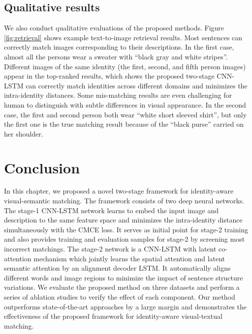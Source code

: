 \subsection{Qualitative results}
We also conduct qualitative evaluations of the proposed methods. Figure \ref{fig:retrieval} shows example text-to-image retrieval results. Most sentences can correctly match images corresponding to their descriptions. In the first case, almost all the persons wear a sweater with ``black gray and white stripes''. Different images of the same identity (the first, second, and fifth person images) appear in the top-ranked results, which shows the proposed two-stage CNN-LSTM can correctly match identities across different domains and minimizes the intra-identity distances. Some mis-matching results are even challenging for human to distinguish with subtle differences in visual appearance. In the second case, the first and second person both wear ``white short sleeved shirt'', but only the first one is the true matching result because of the ``black purse'' carried on her shoulder.

\section{Conclusion}
In this chapter, we proposed a novel two-stage framework for identity-aware visual-semantic matching. The framework consists of two deep neural networks. The stage-1 CNN-LSTM network learns to embed the input image and description to the same feature space and minimizes the intra-identity distance simultaneously with the CMCE loss. It serves as initial point for stage-2 training and also provides training and evaluation samples for stage-2 by screening most incorrect matchings.
The stage-2 network is a CNN-LSTM with latent co-attention mechanism which jointly learns the spatial attention and latent semantic attention by an alignment decoder LSTM. It automatically aligns different words and image regions to minimize the impact of sentence structure variations. We evaluate the proposed method on three datasets and perform a series of ablation studies to verify the effect of each component. Our method outperforms state-of-the-art approaches by a large margin and demonstrates the effectiveness of the proposed framework for identity-aware visual-textual matching.

